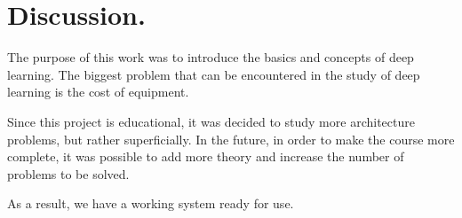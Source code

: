 \section{Discussion.}

The purpose of this work was to introduce the basics and concepts of deep learning. The biggest problem that can be encountered in the study of deep learning is the cost of equipment.


Since this project is educational, it was decided to study more architecture problems, but rather superficially. In the future, in order to make the course more complete, it was possible to add more theory and increase the number of problems to be solved.


As a result, we have a working system ready for use.